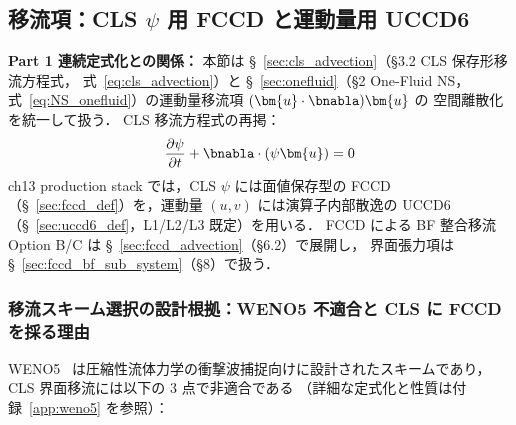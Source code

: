 %
%
\label{sec:discretization_modules}%
\label{sec:advection}%

\subsection{移流項：CLS $\psi$ 用 FCCD と運動量用 UCCD6}
\label{sec:advection_motivation}

\noindent\textbf{Part 1 連続定式化との関係：}
本節は §~\ref{sec:cls_advection}（§3.2 CLS 保存形移流方程式，
式~\eqref{eq:cls_advection}）と §~\ref{sec:onefluid}（§2 One-Fluid NS，
式~\eqref{eq:NS_onefluid}）の運動量移流項 $(\bm{u}\cdot\bnabla)\bm{u}$ の
空間離散化を統一して扱う．
CLS 移流方程式の再掲：
\begin{equation}
  \frac{\partial\psi}{\partial t} + \bnabla\cdot(\psi\bm{u}) = 0
  \label{eq:cls_advection_ref}
\end{equation}
ch13 production stack では，CLS $\psi$ には面値保存型の FCCD
（§~\ref{sec:fccd_def}）を，運動量 $(u,v)$ には演算子内部散逸の
UCCD6（§~\ref{sec:uccd6_def}，L1/L2/L3 既定）を用いる．
FCCD による BF 整合移流 Option B/C は §~\ref{sec:fccd_advection}（§6.2）で展開し，
界面張力項は §~\ref{sec:fccd_bf_sub_system}（§8）で扱う．

\subsubsection{移流スキーム選択の設計根拠：WENO5 不適合と CLS に FCCD を採る理由}
\label{sec:advection_weno5_critique}

WENO5~\cite{JiangShu1996} は圧縮性流体力学の衝撃波捕捉向けに設計されたスキームであり，
CLS 界面移流には以下の 3 点で非適合である
（詳細な定式化と性質は付録~\ref{app:weno5} を参照）：

